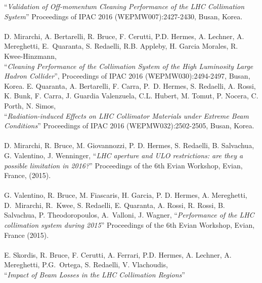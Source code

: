 ``\textit{Validation of Off-momentum Cleaning Performance of the LHC Collimation System}'' \newline
Proceedings of IPAC 2016 (WEPMW007):2427-2430, Busan, Korea. 
% 	 	
\\ \mbox{} \\
D. Mirarchi, A. Bertarelli, R. Bruce, F. Cerutti, P.D. Hermes, A. Lechner, A. Mereghetti, \mbox{E. Quaranta}, S. Redaelli, R.B. Appleby, H. Garcia Morales, R. Kwee-Hinzmann, \\ 
``\textit{Cleaning Performance of the Collimation System of the High Luminosity Large Hadron Collider}'', Proceedings of IPAC 2016 (WEPMW030):2494-2497, Busan, Korea. 
% 	 	
\newpage
E. Quaranta, A. Bertarelli, F. Carra, P.~D. Hermes, S. Redaelli, A. Rossi, K. Bunk, F. Carra, J. Guardia Valenzuela, C.L. Hubert, M. Tomut, P. Nocera, C. Porth, N. Simos, \\ 
``\textit{Radiation-induced Effects on LHC Collimator Materials under Extreme Beam Conditions}'' \newline
Proceedings of IPAC 2016 (WEPMW032):2502-2505, Busan, Korea. 
%
\\ \mbox{} \\
D. Mirarchi, R. Bruce, M. Giovannozzi, P. D. Hermes, S. Redaelli, B. Salvachua, G. Valentino, J. Wenninger,  
``\textit{LHC aperture and ULO restrictions: are they a possible limitation in 2016?}'' \newline
Proceedings of the 6th Evian Workshop,  Evian, France, (2015).
\\ \mbox{} \\
G. Valentino, R. Bruce, M. Fiascaris, H. Garcia, P. D. Hermes, A. Mereghetti, \mbox{D. Mirarchi}, \mbox{R. Kwee}, S. Redaelli, E. Quaranta, A. Rossi, R. Rossi, B. Salvachua, P. Theodoropoulos, \mbox{A. Valloni}, J. Wagner, ``\textit{Performance of the LHC collimation system during 2015}'' \newline
Proceedings of the 6th Evian Workshop, Evian, France (2015).
\\ \mbox{} \\ 	 	
% 	 	
E. Skordis, R. Bruce, F. Cerutti, A. Ferrari, P.D. Hermes, A. Lechner, A. Mereghetti, \mbox{P.G. Ortega}, S. Redaelli, V. Vlachoudis, \\ ``\textit{Impact of Beam Losses in the LHC Collimation Regions}'' \newline
